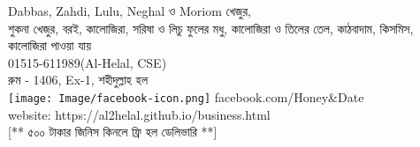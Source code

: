 \documentclass[a4paper,12pt]{article}
\begin{document}
\centering
{}
{
\begin{minipage}{0.43\textwidth}
Dabbas, Zahdi, Lulu, Neghal  ও Moriom খেজুর,\\ শুকনা খেজুর, বরই, কালোজিরা, সরিষা ও  লিচু ফুলের মধু, কালোজিরা ও তিলের তেল, কাঠবাদাম, কিসমিস, কালোজিরা পাওয়া যায়\\01515-611989(Al-Helal, CSE)\\
রুম - 1406, Ex-1, শহীদুল্লাহ হল\\
\texttt{[image: Image/facebook-icon.png]} facebook.com/Honey\&Date\\ website: https://al2helal.github.io/business.html\\ [** ৫০০ টাকার জিনিস কিনলে ফ্রি হল ডেলিভারি **]
\end{minipage}\vspace{0.3cm}
}
\end{document}
